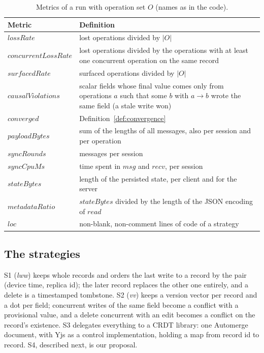 \begin{table}[ht]
\caption{Metrics of a run with operation set $O$ (names as in the code).}
\label{tab:metrics}
\footnotesize
\begin{tabular}{@{}l>{\raggedright\arraybackslash}p{}@{}}
\toprule
Metric & Definition \\
\midrule
$\mathit{lossRate}$ & lost operations divided by $|O|$ \\
$\mathit{concurrentLossRate}$ & lost operations divided by the operations with at least one concurrent operation on
  the same record \\
$\mathit{surfacedRate}$ & surfaced operations divided by $|O|$ \\
$\mathit{causalViolations}$ & scalar fields whose final value comes only from operations $a$ such that some $b$
  with $a \to b$ wrote the same field (a stale write won) \\
$\mathit{converged}$ & Definition~\ref{def:convergence} \\
$\mathit{payloadBytes}$ & sum of the lengths of all messages, also per session and per operation \\
$\mathit{syncRounds}$ & messages per session \\
$\mathit{syncCpuMs}$ & time spent in $\mathit{msg}$ and $\mathit{recv}$, per session \\
$\mathit{stateBytes}$ & length of the persisted state, per client and for the server \\
$\mathit{metadataRatio}$ & $\mathit{stateBytes}$ divided by the length of the JSON encoding of $\mathit{read}$ \\
$\mathit{loc}$ & non-blank, non-comment lines of code of a strategy \\
\bottomrule
\end{tabular}
\end{table}

\subsection{The strategies}
S1 (\emph{lww}) keeps whole records and orders the last write to a record by the pair (device time, replica id); the
later record replaces the other one entirely, and a delete is a timestamped tombstone. S2 (\emph{vv}) keeps a version
vector per record and a dot per field; concurrent writes of the same field become a conflict with a provisional value,
and a delete concurrent with an edit becomes a conflict on the record's existence. S3 delegates everything to a CRDT
library: one Automerge document, with Yjs as a control implementation, holding a map from record id to record. S4,
described next, is our proposal.

